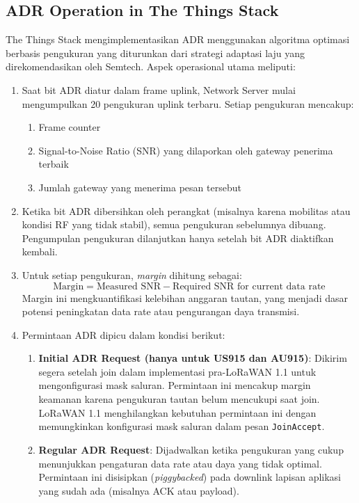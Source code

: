 \subsection{ADR Operation in The Things Stack}
The Things Stack mengimplementasikan ADR menggunakan algoritma optimasi berbasis pengukuran yang diturunkan dari strategi adaptasi laju yang direkomendasikan oleh Semtech. Aspek operasional utama meliputi:
\begin{enumerate}
    \item Saat bit ADR diatur dalam frame uplink, Network Server mulai mengumpulkan 20 pengukuran uplink terbaru. Setiap pengukuran mencakup:
          \begin{enumerate}
              \item Frame counter
              \item Signal-to-Noise Ratio (SNR) yang dilaporkan oleh gateway penerima terbaik
              \item Jumlah gateway yang menerima pesan tersebut
          \end{enumerate}
    \item Ketika bit ADR dibersihkan oleh perangkat (misalnya karena mobilitas atau kondisi RF yang tidak stabil), semua pengukuran sebelumnya dibuang. Pengumpulan pengukuran dilanjutkan hanya setelah bit ADR diaktifkan kembali.
    \item Untuk setiap pengukuran, \emph{margin} dihitung sebagai:
          \[
              \text{Margin} = \text{Measured SNR} - \text{Required SNR for current data rate}
          \]
          Margin ini mengkuantifikasi kelebihan anggaran tautan, yang menjadi dasar potensi peningkatan data rate atau pengurangan daya transmisi.
    \item Permintaan ADR dipicu dalam kondisi berikut:
          \begin{enumerate}
              \item \textbf{Initial ADR Request (hanya untuk US915 dan AU915)}: Dikirim segera setelah join dalam implementasi pra-LoRaWAN 1.1 untuk mengonfigurasi mask saluran. Permintaan ini mencakup margin keamanan karena pengukuran tautan belum mencukupi saat join. LoRaWAN 1.1 menghilangkan kebutuhan permintaan ini dengan memungkinkan konfigurasi mask saluran dalam pesan \texttt{JoinAccept}.
              \item \textbf{Regular ADR Request}: Dijadwalkan ketika pengukuran yang cukup menunjukkan pengaturan data rate atau daya yang tidak optimal. Permintaan ini disisipkan (\emph{piggybacked}) pada downlink lapisan aplikasi yang sudah ada (misalnya ACK atau payload).

\end{enumerate}
\end{enumerate}
